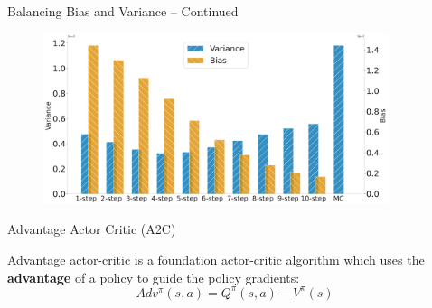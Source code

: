 \begin{frame}[t]{Balancing Bias and Variance -- Continued}
    \begin{figure}
        \centering
        \includegraphics[width=0.9\textwidth]{images/chapter_8/a2c_lbf_nstep_comparison.pdf}
    \end{figure}
\end{frame}

\begin{frame}[t]{Advantage Actor Critic (A2C)}

Advantage actor-critic is a foundation actor-critic algorithm which uses the \textbf{advantage} of a policy to guide the policy gradients:
\[
    Adv^{\pi}(s, a) = Q^{\pi}(s, a) - V^{\pi}(s)
\]

\end{frame}

